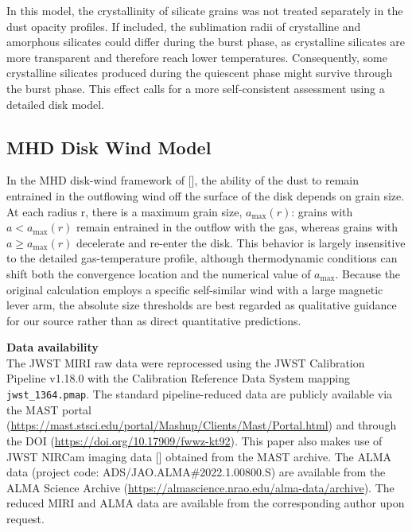 \documentclass[pdflatex,sn-mathphys-num]{sn-jnl}
\theoremstyle{thmstyleone}
\theoremstyle{thmstyletwo}
\theoremstyle{thmstylethree}
\begin{document}
\begin{bibunit}
In this model, the crystallinity of silicate grains was not treated separately in the dust opacity profiles. If included, the sublimation radii of crystalline and amorphous silicates could differ \citep{Dullemond2010} during the burst phase, as crystalline silicates are more transparent and therefore reach lower temperatures. Consequently, some crystalline silicates produced during the quiescent phase might survive through the burst phase. This effect calls for a more self-consistent assessment using a detailed disk model.

\subsection{MHD Disk Wind Model}
In the MHD disk-wind framework of [], the ability of the dust to remain entrained in the outflowing wind off the surface of the disk depends on grain size.
At each radius r, there is a maximum grain size, $a_{\mathrm{max}}(r)$: grains with $a < a_{\mathrm{max}}(r)$ remain entrained in the outflow with the gas, whereas grains with $a \geq a_{\mathrm{max}}(r)$ decelerate and re-enter the disk. This behavior is largely insensitive to the detailed gas-temperature profile, although thermodynamic conditions can shift both the convergence location and the numerical value of $a_{\mathrm{max}}$. Because the original calculation employs a specific self-similar wind with a large magnetic lever arm, the absolute size thresholds are best regarded as qualitative guidance for our source rather than as direct quantitative predictions.


\clearpage

\backmatter

\vspace{0.3cm}
\noindent
{\bf Data availability}\\
The JWST MIRI raw data were reprocessed using the JWST Calibration Pipeline v1.18.0 \citep{Bushouse2023} with the Calibration Reference Data System  \citep{Greenfield2016} mapping \texttt{jwst\_1364.pmap}. The standard pipeline-reduced data are publicly available via the MAST portal (\url{https://mast.stsci.edu/portal/Mashup/Clients/Mast/Portal.html}) and through the DOI (\url{https://doi.org/10.17909/fwwz-kt92}). This paper also makes use of JWST NIRCam imaging data [] obtained from the MAST archive.
The ALMA data (project code: ADS/JAO.ALMA\#2022.1.00800.S) are available from the ALMA Science Archive (\url{https://almascience.nrao.edu/alma-data/archive}).
The reduced MIRI and ALMA data are available from the corresponding author upon request.


\end{bibunit}
\end{document}
